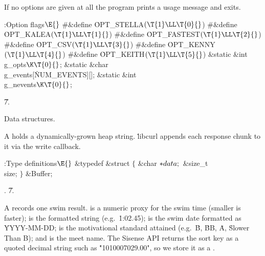 If no options are given at all the program prints a usage message and exits.

\Y\B\4:Option flags\X${}\E{}$\6
\8\#\&{define} \.{OPT\_STELLA}\5${}(\T{1}\LL\T{0}{}$)\6
\8\#\&{define} \.{OPT\_KALEA}\5${}(\T{1}\LL\T{1}{}$)\6
\8\#\&{define} \.{OPT\_FASTEST}\5${}(\T{1}\LL\T{2}{}$)\6
\8\#\&{define} \.{OPT\_CSV}\5${}(\T{1}\LL\T{3}{}$)\6
\8\#\&{define} \.{OPT\_KENNY}\5${}(\T{1}\LL\T{4}{}$)\6
\8\#\&{define} \.{OPT\_KEITH}\5${}(\T{1}\LL\T{5}{}$)\6
\&{static} \&{int} \\{g\_opts}${}\K\T{0}{}$;\6
\&{static} \&{char} \\{g\_events}[\.{NUM\_EVENTS}][];\6
\&{static} \&{int} \\{g\_nevents}${}\K\T{0}{}$;\par
\U7.\fi

Data structures.

\fi

A  holds a dynamically-grown heap string.  \.{libcurl}
appends each response chunk to it via the write callback.

\Y\B\4:Type definitions\X${}\E{}$\6
\&{typedef} \&{struct} ${}\{{}$\1\6
\&{char} ${}{*}\\{data};{}$\6
\&{size\_t} \\{size};\2\6
${}\}{}$ \&{Buffer};\par
{}.
\U7.\fi

A  records one swim result.   is a
numeric proxy
for the swim time (smaller is faster);  is the formatted string
(e.g.\ \.{1:02.45});  is the swim date formatted as
\.{YYYY-MM-DD};  is the motivational standard attained
(e.g.\ \.{B}, \.{BB}, \.{A}, \.{Slower Than B}); and  is the
meet name.  The Sisense API returns the sort key as a quoted decimal
string such as \.{"1010007029.00"}, so we store it as a .

